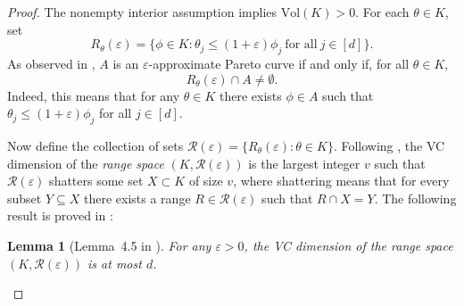 \documentclass[11pt]{article}
\newcommand{\vol}{\mathrm{Vol}}
\renewcommand{\le}{\leqslant}
\newtheorem{lemma}{Lemma}
\theoremstyle{definition}
\theoremstyle{remark}
\begin{document}
\begin{proof}
The nonempty interior assumption implies $\vol(K)>0$. For each $\theta \in K$, set
\[
R_{\theta}(\varepsilon) = \{\phi \in K: \theta_j\le (1 + \varepsilon)\phi_j\ \textrm{for all}\ j \in [d]\}.
\]
As observed in \cite[Section~4.1]{diakonikolas2010small}, $A$ is an $\varepsilon$-approximate Pareto curve if and only if, for all $\theta \in K$,
\[
R_\theta(\varepsilon) \cap A \neq \emptyset.
\]
Indeed, this means that for any $\theta\in K$ there exists $\phi\in A$ such that $\theta_j\le (1 + \varepsilon)\phi_j$ for all $j \in [d]$.

Now define the collection of sets $\mathcal{R}(\varepsilon) = \{R_{\theta}(\varepsilon): \theta \in K\}$. Following \cite{haussler1986epsilon}, the VC dimension of the \emph{range space} $(K,\mathcal{R}(\varepsilon))$ is the largest integer $v$ such that $\mathcal{R}(\varepsilon)$ shatters some set $X\subset K$ of size $v$, where shattering means that for every subset $Y\subseteq X$ there exists a range $R\in\mathcal{R}(\varepsilon)$ such that $R\cap X = Y$. The following result is proved in \cite{diakonikolas2010small}:
\begin{lemma}[Lemma~4.5 in \cite{diakonikolas2010small}]
\label{lem:diakonikolassmall}
For any $\varepsilon>0$, the VC dimension of the range space $(K,\mathcal{R}(\varepsilon))$ is at most $d$.
\end{lemma}


\end{proof}
\end{document}
